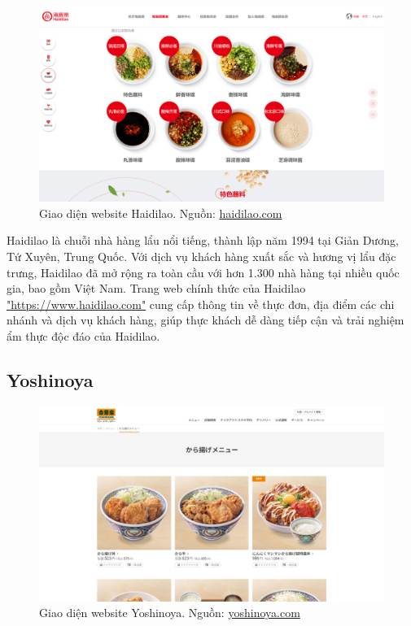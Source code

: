 \begin{figure}[H]
    \centering
    \includegraphics[width=15cm]{Images/haidilao.png}
    \vspace{0.5cm}
    \caption{Giao diện website Haidilao. Nguồn: \href{https://www.haidilao.com}{haidilao.com}}
    \label{fig:my_label}
\end{figure}

Haidilao là chuỗi nhà hàng lẩu nổi tiếng, thành lập năm 1994 tại Giản Dương, Tứ Xuyên, Trung Quốc. Với dịch vụ khách hàng xuất sắc và hương vị lẩu đặc trưng, Haidilao đã mở rộng ra toàn cầu với hơn 1.300 nhà hàng tại nhiều quốc gia, bao gồm Việt Nam. Trang web chính thức của Haidilao \href{https://www.haidilao.com/}{"https://www.haidilao.com"} cung cấp thông tin về thực đơn, địa điểm các chi nhánh và dịch vụ khách hàng, giúp thực khách dễ dàng tiếp cận và trải nghiệm ẩm thực độc đáo của Haidilao.

\subsection{Yoshinoya}

\begin{figure}[H]
    \centering
    \includegraphics[width=15cm]{Images/yoshinoya.png}
    \vspace{0.5cm}
    \caption{Giao diện website Yoshinoya. Nguồn: \href{https://www.yoshinoya.com}{yoshinoya.com}}
    \label{fig:my_label}
\end{figure}


